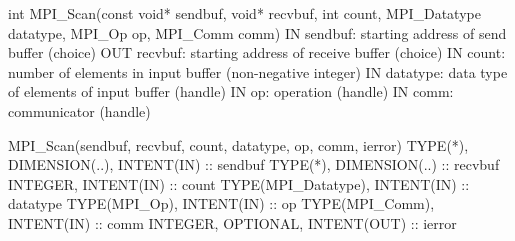 int MPI_Scan(const void* sendbuf, void* recvbuf,
    int count, MPI_Datatype datatype, MPI_Op op, MPI_Comm comm)
IN sendbuf: starting address of send buffer (choice)
OUT recvbuf: starting address of receive buffer (choice)
IN count: number of elements in input buffer (non-negative integer)
IN datatype: data type of elements of input buffer (handle)
IN op: operation (handle)
IN comm: communicator (handle)

MPI_Scan(sendbuf, recvbuf, count, datatype, op, comm, ierror)
TYPE(*), DIMENSION(..), INTENT(IN) :: sendbuf
TYPE(*), DIMENSION(..) :: recvbuf
INTEGER, INTENT(IN) :: count
TYPE(MPI_Datatype), INTENT(IN) :: datatype
TYPE(MPI_Op), INTENT(IN) :: op
TYPE(MPI_Comm), INTENT(IN) :: comm
INTEGER, OPTIONAL, INTENT(OUT) :: ierror
